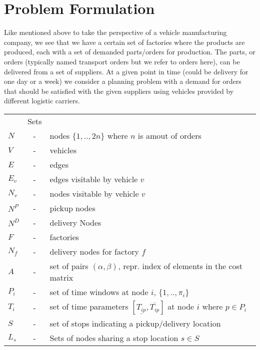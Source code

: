 \documentclass[a4paper,10pt]{article}
\begin{document}
\section{Problem Formulation} \label{sec:PForm}
Like mentioned above to take the perspective of a vehicle manufacturing company, we see that we have a certain set of factories where the products are produced, each with a set of demanded parts/orders for production.
The parts, or orders (typically named transport orders but we refer to orders here), can be delivered from a set of suppliers.
At a given point in time (could be delivery for one day or a week) we consider a planning problem with a demand for orders that should be satisfied with the given suppliers using vehicles provided by different logistic carriers.
\linebreak

\begin{tabular}{l c l }
              &Sets 					        	\\ 
    $N      $ &-& nodes $\{1,..,2n\}$ where $n$ is amout of orders      \\
    $V      $ &-& vehicles  					        \\
    $E      $ &-& edges 					        \\
    $E_v    $ &-& edges visitable by vehicle $v$ 		        \\
    $N_v    $ &-& nodes visitable by vehicle $v$  		        \\
    $N^P    $ &-& pickup nodes 					        \\
    $N^D    $ &-& delivery Nodes 				        \\
    $F      $ &-& factories 					        \\
    $N_f    $ &-& delivery nodes for factory $f$ 		        \\
    $A      $ &-& set of pairs $(\alpha, \beta)$, repr. 
                  index of elements in the cost matrix                 \\
    $P_i    $ &-& set of time windows at node $i$, $\{1,..,\pi_i \}$	\\
    $T_{i}  $ &-& set of time parameters $[ \underline{T_{ip}},  
		  \overline{T_{ip}} ]$ at node $i$ where $p \in P_i$	\\
    $S      $ &-& set of stops indicating a pickup/delivery location    \\
    $L_s    $ &-& Sets of nodes sharing a stop location 
                  $s \in S$ 	                                        \\
\end{tabular}
\linebreak
\linebreak
\par
\end{document}
